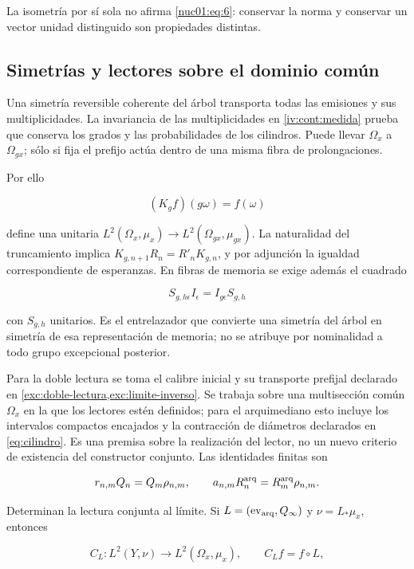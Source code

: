 La isometría por sí sola no afirma \eqref{nuc01:eq:6}: conservar la norma y conservar un vector unidad distinguido son propiedades distintas.

\subsection{Simetrías y lectores sobre el dominio común}

Una simetría reversible coherente del árbol transporta todas las emisiones y sus multiplicidades. La invariancia de las multiplicidades en \cref{iv:cont:medida} prueba que conserva los grados y las probabilidades de los cilindros. Puede llevar \(\Omega_x\) a \(\Omega_{gx}\); sólo si fija el prefijo actúa dentro de una misma fibra de prolongaciones.

Por ello

\[
(K_gf)(g\omega)=f(\omega)
\]

define una unitaria \(L^2(\Omega_x,\mu_x)\to L^2(\Omega_{gx},\mu_{gx})\). La naturalidad del truncamiento implica \(K_{g,n+1}R_n=R'_nK_{g,n}\), y por adjunción la igualdad correspondiente de esperanzas. En fibras de memoria se exige además el cuadrado

\[
S_{g,h\epsilon}I_\epsilon=I_{g\epsilon}S_{g,h}
\]

con \(S_{g,h}\) unitarios. Es el entrelazador que convierte una simetría del árbol en simetría de esa representación de memoria; no se atribuye por nominalidad a todo grupo excepcional posterior.

Para la doble lectura se toma el calibre inicial y su transporte prefijal declarado en \cref{exc:doble-lectura,exc:limite-inverso}. Se trabaja sobre una multisección común \(\Omega_x\) en la que los lectores estén definidos; para el arquimediano esto incluye los intervalos compactos encajados y la contracción de diámetros declarados en \eqref{eq:cilindro}. Es una premisa sobre la realización del lector, no un nuevo criterio de existencia del constructor conjunto. Las identidades finitas son

\begin{equation}
r_{n,m}Q_n=Q_m\rho_{n,m},\qquad
a_{n,m}R^{\rm arq}_n=R^{\rm arq}_m\rho_{n,m}.
\label{nuc01:eq:7}
\end{equation}

Determinan la lectura conjunta al límite. Si \(L=(\operatorname{ev}_{\rm arq},Q_\infty)\) y \(\nu=L_*\mu_x\), entonces

\[
C_L:L^2(Y,\nu)\longrightarrow L^2(\Omega_x,\mu_x),
\qquad C_Lf=f\circ L,
\]

